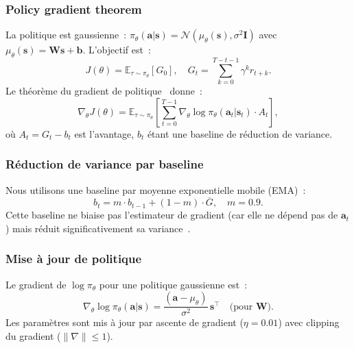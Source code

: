 \documentclass[12pt,a4paper]{article}
\newcommand{\nab}{\nabla}
\begin{document}
\subsubsection{Policy gradient theorem}

La politique est gaussienne~: $\pi_\theta(\bm{a}|\bm{s}) = \mathcal{N}(\mu_\theta(\bm{s}), \sigma^2\bm{I})$
avec $\mu_\theta(\bm{s}) = \bm{W}\bm{s} + \bm{b}$. L'objectif est~:
\begin{equation}
    J(\theta) = \mathbb{E}_{\tau \sim \pi_\theta}[G_0],
    \quad G_t = \sum_{k=0}^{T-t-1}\gamma^k r_{t+k}.
    \label{eq:rl-objective}
\end{equation}
Le théorème du gradient de politique~\cite{Williams1992,Sutton2018} donne~:
\begin{equation}
    \nab_\theta J(\theta) = \mathbb{E}_{\tau \sim \pi_\theta}\!\left[
    \sum_{t=0}^{T-1}\nab_\theta \log\pi_\theta(\bm{a}_t|\bm{s}_t)
    \cdot A_t \right],
    \label{eq:policy-gradient}
\end{equation}
où $A_t = G_t - b_t$ est l'avantage, $b_t$ étant une baseline de réduction de
variance.

\subsubsection{Réduction de variance par baseline}

Nous utilisons une baseline par moyenne exponentielle mobile (EMA)~:
\begin{equation}
    b_t = m \cdot b_{t-1} + (1-m)\cdot\overline{G}, \quad m = 0.9.
    \label{eq:rl-baseline}
\end{equation}
Cette baseline ne biaise pas l'estimateur de gradient (car elle ne dépend pas de
$\bm{a}_t$) mais réduit significativement sa variance~\cite{Sutton2018}.

\subsubsection{Mise à jour de politique}

Le gradient de $\log\pi_\theta$ pour une politique gaussienne est~:
\begin{equation}
    \nab_\theta \log\pi_\theta(\bm{a}|\bm{s}) =
    \frac{(\bm{a} - \mu_\theta)}{\sigma^2}\,\bm{s}^\top
    \quad\text{(pour $\bm{W}$)}.
    \label{eq:rl-grad-logpi}
\end{equation}
Les paramètres sont mis à jour par ascente de gradient ($\eta = 0.01$) avec
clipping du gradient ($\|\nab\| \leq 1$).
\end{document}
